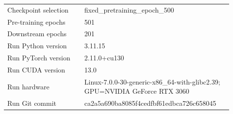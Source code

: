 \begin{table}[p]
\begin{tabular}{p{0.32\linewidth}p{0.60\linewidth}}
Checkpoint selection & fixed\_pretraining\_epoch\_500 \\
Pre-training epochs & 501 \\
Downstream epochs & 201 \\
Run Python version & 3.11.15 \\
Run PyTorch version & 2.11.0+cu130 \\
Run CUDA version & 13.0 \\
Run hardware & Linux-7.0.0-30-generic-x86\_64-with-glibc2.39; GPU=NVIDIA GeForce RTX 3060 \\
Run Git commit & ca2a5a690ba8085f4cedfbf61edbca726c658045 \\
\bottomrule
\end{tabular}
\end{table}
